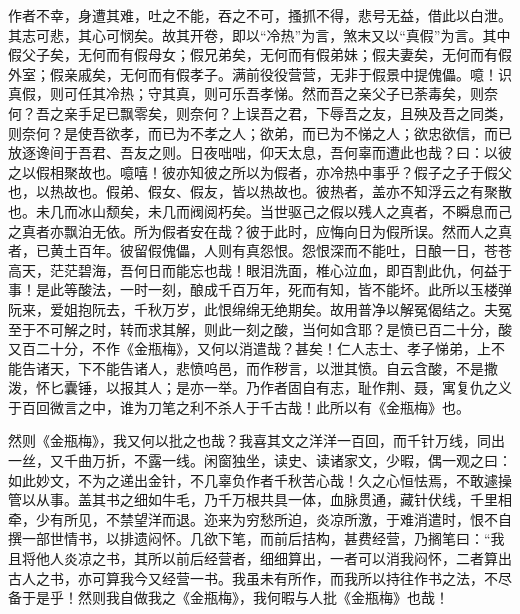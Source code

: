 {作者不幸，身遭其难，吐之不能，吞之不可，搔抓不得，悲号无益，借此以白泄。其志可悲，其心可悯矣。故其开卷，即以“冷热”为言，煞末又以“真假”为言。其中假父子矣，无何而有假母女；假兄弟矣，无何而有假弟妹；假夫妻矣，无何而有假外室；假亲戚矣，无何而有假孝子。满前役役营营，无非于假景中提傀儡。噫！识真假，则可任其冷热；守其真，则可乐吾孝悌。然而吾之亲父子已荼毒矣，则奈何？吾之亲手足已飘零矣，则奈何？上误吾之君，下辱吾之友，且殃及吾之同类，则奈何？是使吾欲孝，而已为不孝之人；欲弟，而已为不悌之人；欲忠欲信，而已放逐谗间于吾君、吾友之则。日夜咄咄，仰天太息，吾何辜而遭此也哉？曰：以彼之以假相聚故也。噫嘻！彼亦知彼之所以为假者，亦冷热中事乎？假子之子于假父也，以热故也。假弟、假女、假友，皆以热故也。彼热者，盖亦不知浮云之有聚散也。未几而冰山颓矣，未几而阀阅朽矣。当世驱己之假以残人之真者，不瞬息而己之真者亦飘泊无依。所为假者安在哉？彼于此时，应悔向日为假所误。然而人之真者，已黄土百年。彼留假傀儡，人则有真怨恨。怨恨深而不能吐，日酿一日，苍苍高天，茫茫碧海，吾何日而能忘也哉！眼泪洗面，椎心泣血，即百割此仇，何益于事！是此等酸法，一时一刻，酿成千百万年，死而有知，皆不能坏。此所以玉楼弹阮来，爱姐抱阮去，千秋万岁，此恨绵绵无绝期矣。故用普净以解冤偈结之。夫冤至于不可解之时，转而求其解，则此一刻之酸，当何如含耶？是愤已百二十分，酸又百二十分，不作《金瓶梅》，又何以消遣哉？甚矣！仁人志士、孝子悌弟，上不能告诸天，下不能告诸人，悲愤呜邑，而作秽言，以泄其愤。自云含酸，不是撒泼，怀匕囊锤，以报其人；是亦一举。乃作者固自有志，耻作荆、聂，寓复仇之义于百回微言之中，谁为刀笔之利不杀人于千古哉！此所以有《金瓶梅》也。


然则《金瓶梅》，我又何以批之也哉？我喜其文之洋洋一百回，而千针万线，同出一丝，又千曲万折，不露一线。闲窗独坐，读史、读诸家文，少暇，偶一观之曰：如此妙文，不为之递出金针，不几辜负作者千秋苦心哉！久之心恒怯焉，不敢遽操管以从事。盖其书之细如牛毛，乃千万根共具一体，血脉贯通，藏针伏线，千里相牵，少有所见，不禁望洋而退。迩来为穷愁所迫，炎凉所激，于难消遣时，恨不自撰一部世情书，以排遗闷怀。几欲下笔，而前后拮构，甚费经营，乃搁笔曰：“我且将他人炎凉之书，其所以前后经营者，细细算出，一者可以消我闷怀，二者算出古人之书，亦可算我今又经营一书。我虽未有所作，而我所以持往作书之法，不尽备于是乎！然则我自做我之《金瓶梅》，我何暇与人批《金瓶梅》也哉！

} %



